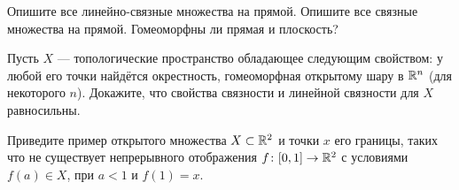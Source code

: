 \documentclass[a4paper,11pt]{article}
\begin{document}
    Опишите все линейно-связные множества на прямой.
    Опишите все связные множества на прямой.
    Гомеоморфны ли прямая и плоскость?

    Пусть $X$ --- топологические пространство обладающее следующим свойством: у любой его точки найдётся окрестность, гомеоморфная открытому шару в $\mathbb{R}^n$ (для некоторого $n$). Докажите, что свойства связности и линейной связности для $X$ равносильны.

    Приведите пример открытого множества $X \subset \mathbb{R}^2$ и точки $x$ его границы, таких что не существует непрерывного отображения $f \colon [0,1] \rightarrow \mathbb{R}^2$ с условиями $f(a) \in X$, при $a < 1$ и $f(1) = x$.

\end{document}
